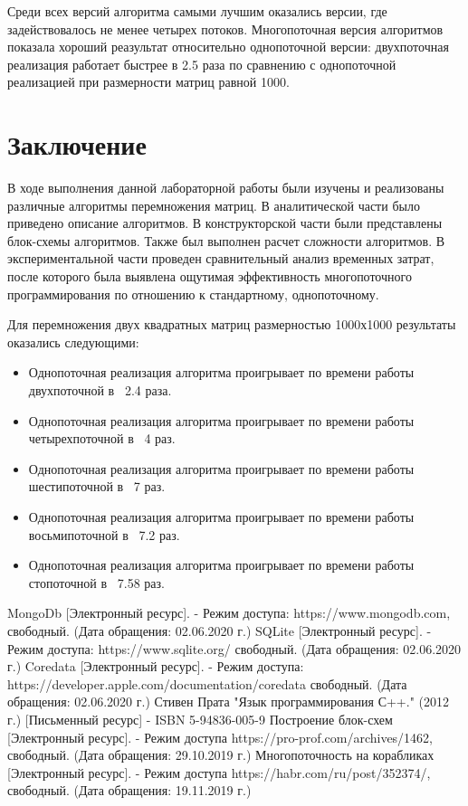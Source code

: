 \documentclass[12pt, a4paper]{report}
\begin{document}
	\vspace{0.3cm}Среди всех версий алгоритма самыми лучшим оказались версии, где задействовалось не менее четырех потоков. Многопоточная версия алгоритмов показала хороший реазультат относительно однопоточной версии: двухпоточная реализация работает быстрее в 2.5 раза по сравнению с однопоточной реализацией при размерности матриц равной 1000.

	\newpage

	\chapter*{Заключение}
		\vspace{-0.6cm}\hspace{0.5cm}В ходе выполнения данной лабораторной работы были изучены и реализованы различные алгоритмы перемножения матриц. В аналитической части было приведено описание алгоритмов. В конструкторской части были представлены блок-схемы алгоритмов. Также был выполнен расчет сложности алгоритмов. В экспериментальной части проведен сравнительный анализ временных затрат, после которого была выявлена ощутимая эффективность многопоточного программирования по отношению к стандартному, однопоточному. 
		
		\vspace{0.3cm}Для перемножения двух квадратных матриц размерностью 1000х1000 результаты оказались следующими:
	\begin{itemize} 
		\item Однопоточная реализация алгоритма проигрывает по времени работы двухпоточной в ~2.4 раза.
		\item Однопоточная реализация алгоритма проигрывает по времени работы четырехпоточной в ~4 раз.
		\item Однопоточная реализация алгоритма проигрывает по времени работы шестипоточной в ~7 раз.
		\item Однопоточная реализация алгоритма проигрывает по времени работы восьмипоточной в ~7.2 раз.
		\item Однопоточная реализация алгоритма проигрывает  по времени работы стопоточной в ~7.58 раз.
	\end{itemize}
	
	\newpage

\begin{thebibliography}{3}
	MongoDb [Электронный ресурс]. - Режим доступа: https://www.mongodb.com, свободный. (Дата обращения: 02.06.2020 г.)
	SQLite [Электронный ресурс]. - Режим доступа: https://www.sqlite.org/ свободный. (Дата обращения: 02.06.2020 г.)
	Coredata [Электронный ресурс]. - Режим доступа: https://developer.apple.com/documentation/coredata свободный. (Дата обращения: 02.06.2020 г.)
	Стивен Прата "Язык программирования С++." (2012 г.) [Письменный ресурс] - ISBN 5-94836-005-9
	Построение блок-схем [Электронный ресурс]. - Режим доступа https://pro-prof.com/archives/1462, свободный. (Дата обращения: 29.10.2019 г.)
	Многопоточность на корабликах [Электронный ресурс]. - Режим доступа https://habr.com/ru/post/352374/, свободный. (Дата обращения: 19.11.2019 г.)
\end{thebibliography}
\end{document}
